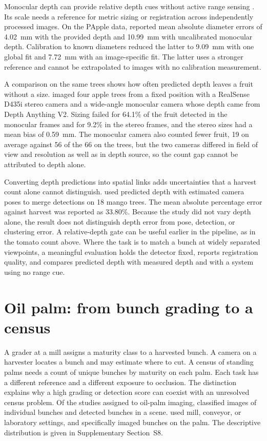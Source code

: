 Monocular depth can provide relative depth cues without active range sensing \citep{ranftl2021vision}. Its scale needs a reference for metric sizing or registration across independently processed images. On the PApple data, \citet{tan2025apple} reported mean absolute diameter errors of 4.02~mm with the provided depth and 10.99~mm with uncalibrated monocular depth. Calibration to known diameters reduced the latter to 9.09~mm with one global fit and 7.72~mm with an image-specific fit. The latter uses a stronger reference and cannot be extrapolated to images with no calibration measurement.

A comparison on the same trees shows how often predicted depth leaves a fruit without a size. \citet{piani2025evaluating} imaged four apple trees from a fixed position with a RealSense D435i stereo camera and a wide-angle monocular camera whose depth came from Depth Anything V2. Sizing failed for 64.1\% of the fruit detected in the monocular frames and for 9.2\% in the stereo frames, and the stereo sizes had a mean bias of 0.59~mm. The monocular camera also counted fewer fruit, 19 on average against 56 of the 66 on the trees, but the two cameras differed in field of view and resolution as well as in depth source, so the count gap cannot be attributed to depth alone.

Converting depth predictions into spatial links adds uncertainties that a harvest count alone cannot distinguish. \citet{bellocchio2022novel} used predicted depth with estimated camera poses to merge detections on 18 mango trees. The mean absolute percentage error against harvest was reported as 33.80\%. Because the study did not vary depth alone, the result does not distinguish depth error from pose, detection, or clustering error. A relative-depth gate can be useful earlier in the pipeline, as in the tomato count above. Where the task is to match a bunch at widely separated viewpoints, a meaningful evaluation holds the detector fixed, reports registration quality, and compares predicted depth with measured depth and with a system using no range cue.

\section{Oil palm: from bunch grading to a census}\label{sec:palm}

A grader at a mill assigns a maturity class to a harvested bunch. A camera on a harvester locates a bunch and may estimate where to cut. A census of standing palms needs a count of unique bunches by maturity on each palm. Each task has a different reference and a different exposure to occlusion. The distinction explains why a high grading or detection score can coexist with an unresolved census problem. Of the \nPalm studies assigned to oil-palm imaging, \nPalmCls classified images of individual bunches and \nPalmDet detected bunches in a scene. \nPalmMill used mill, conveyor, or laboratory settings, and \nPalmOnTree specifically imaged bunches on the palm. The descriptive distribution is given in Supplementary Section~S8.

